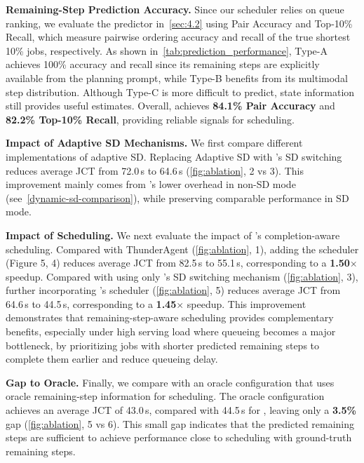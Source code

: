 \textbf{Remaining-Step Prediction Accuracy.}
Since our scheduler relies on queue ranking, we evaluate the predictor in~\autoref{sec:4.2} using Pair Accuracy and Top-10\% Recall, which measure pairwise ordering accuracy and recall of the true shortest 10\% jobs, respectively.
As shown in~\autoref{tab:prediction_performance}, Type-A achieves 100\% accuracy and recall since its remaining steps are explicitly available from the planning prompt, while Type-B benefits from its multimodal step distribution.
Although Type-C is more difficult to predict, state information still provides useful estimates.
Overall, \sysname achieves \textbf{84.1\% Pair Accuracy} and \textbf{82.2\% Top-10\% Recall}, providing reliable signals for scheduling.


\textbf{Impact of Adaptive SD Mechanisms.}
We first compare different implementations of adaptive SD.
Replacing Adaptive SD with \sysname's SD switching reduces average JCT from 72.0\,s to 64.6\,s  (\autoref{fig:ablation}, 2 vs 3). 
This improvement mainly comes from \sysname's lower overhead in non-SD mode (see~\autoref{dynamic-sd-comparison}), while preserving comparable performance in SD mode.

\textbf{Impact of Scheduling.}
We next evaluate the impact of \sysname's completion-aware scheduling.
Compared with ThunderAgent (\autoref{fig:ablation}, 1), adding the \sysname scheduler (Figure 5, 4) reduces average JCT from 82.5\,s to 55.1\,s, corresponding to a \textbf{1.50$\times$} speedup.
Compared with using only \sysname's SD switching mechanism (\autoref{fig:ablation}, 3), further incorporating \sysname's scheduler (\autoref{fig:ablation}, 5) reduces average JCT from 64.6\,s to 44.5\,s, corresponding to a \textbf{1.45$\times$} speedup.
This improvement demonstrates that remaining-step-aware scheduling provides complementary benefits, especially under high serving load where queueing becomes a major bottleneck, by prioritizing jobs with shorter predicted remaining steps to complete them earlier and reduce queueing delay.

\textbf{Gap to Oracle.}
Finally, we compare \sysname with an oracle configuration that uses oracle remaining-step information for scheduling.
The oracle configuration achieves an average JCT of 43.0\,s, compared with 44.5\,s for \sysname, leaving only a \textbf{3.5\%} gap (\autoref{fig:ablation}, 5 vs 6).
This small gap indicates that the predicted remaining steps are sufficient to achieve performance close to scheduling with ground-truth remaining steps.